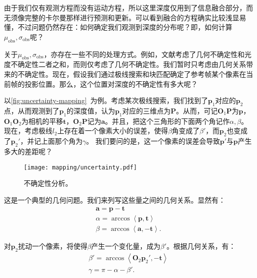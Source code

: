由于我们仅有观测方程而没有运动方程，所以这里深度仅用到了信息融合部分，而无须像完整的卡尔曼那样进行预测和更新。可以看到融合的方程确实比较浅显易懂，不过问题仍然存在：如何确定我们观测到深度的分布呢？即，如何计算$\mu_{\mathrm{obs}}, \sigma_{\mathrm{obs}}$呢？

关于$\mu_{\mathrm{obs}}, \sigma_{\mathrm{obs}}$，亦存在一些不同的处理方式。例如，文献\cite{Engel2013}考虑了几何不确定性和光度不确定性二者之和，而\cite{Vogiatzis2011}则仅考虑了几何不确定性。我们暂时只考虑由几何关系带来的不确定性。现在，假设我们通过极线搜索和块匹配确定了参考帧某个像素在当前帧的投影位置。那么，这个位置对深度的不确定性有多大呢？

以\autoref{fig:uncertainty-mapping}~为例。考虑某次极线搜索，我们找到了$\bm{p}_1$对应的$\bm{p}_2$点，从而观测到了$\bm{p}_1$的深度值，认为$\bm{p}_1$对应的三维点为$\bm{P}$。从而，可记$\bm{O}_1 \bm{P}$为$\bm{p}$，$\bm{O}_1 \bm{O}_2$为相机的平移$\bm{t}$，$\bm{O}_2 \bm{P}$记为$\bm{a}$。并且，把这个三角形的下面两个角记作$\alpha, \beta$。现在，考虑极线$l_2$上存在着一个像素大小的误差，使得$\beta$角变成了$\beta'$，而$\bm{p}_2$也变成了$\bm{p}_2'$，并记上面那个角为$\gamma$。 我们要问的是，这一个像素的误差会导致$\bm{p}'$与$\bm{p}$产生多大的差距呢？

\begin{figure}[!ht]
	\centering
	\texttt{[image: mapping/uncertainty.pdf]}
	\caption{不确定性分析。}
	\label{fig:uncertainty-mapping}
\end{figure}

这是一个典型的几何问题。我们来列写这些量之间的几何关系。显然有：
\begin{equation}
\begin{array}{l}
\bm{a} = \bm{p} - \bm{t} \\
\alpha  = \arccos \left\langle {\bm{p}, \bm{t}} \right\rangle \\
\beta  = \arccos \left\langle {\bm{a}, - \bm{t}} \right\rangle .
\end{array}
\end{equation}

对$\bm{p}_2$扰动一个像素，将使得$\beta$产生一个变化量，成为$\beta '$。根据几何关系，有：
\begin{equation}
\begin{array}{l}
\beta ' = \arccos \left\langle {\bm{O}_2 \bm{p}_2', -\bm{t}} \right\rangle \\
\gamma  = \pi  - \alpha  - \beta '.
\end{array}
\end{equation}

